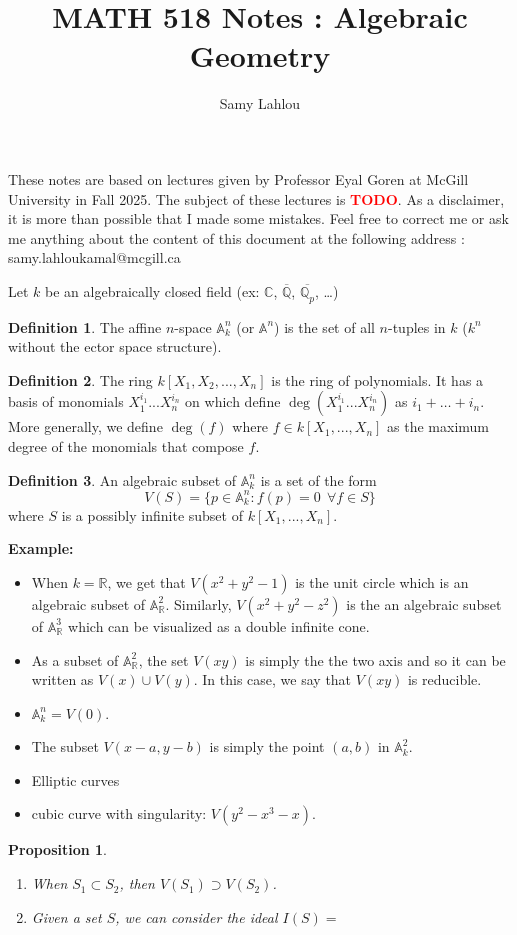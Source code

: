 \documentclass{article}
\title{MATH 518 Notes : Algebraic Geometry}
\author{Samy Lahlou}
\date{}
\theoremstyle{plain}
\newtheorem{proposition}[theorem]{Proposition}
\theoremstyle{definition}
\newtheorem*{definition}{Definition}
\newcommand{\A}{\mathbb{A}}
\newcommand{\C}{\mathbb{C}}
\newcommand{\R}{\mathbb{R}}
\newcommand{\Q}{\mathbb{Q}}
\newcommand{\td}{\textcolor{red}{\textbf{TODO}}}
\newenvironment{example}{\noindent\textbf{Example:} \vspace{-0.2cm}\begin{itemize}}{\end{itemize}}
\begin{document}
\maketitle

These notes are based on lectures given by Professor Eyal Goren at McGill University in Fall 2025. The subject of these lectures is \td. As a disclaimer, it is more than possible that I made some mistakes. Feel free to correct me or ask me anything about the content of this document at the following address : samy.lahloukamal@mcgill.ca

\tableofcontents

\newpage

Let $k$ be an algebraically closed field (ex: $\C$, $\overline{\Q}$, $\overline{\Q_p}$, \dots)

\begin{definition}
    The affine $n$-space $\A_k^n$ (or $\A^n$) is the set of all $n$-tuples in $k$ ($k^n$ without the ector space structure).
\end{definition}

\begin{definition}
    The ring $k[X_1, X_2, ..., X_n]$ is the ring of polynomials. It has a basis of monomials $X_1^{i_1}...X_n^{i_n}$ on which define $\deg(X_1^{i_1}...X_n^{i_n})$ as $i_1 + \dots + i_n$. More generally, we define $\deg(f)$ where $f \in k[X_1, ..., X_n]$ as the maximum degree of the monomials that compose $f$.
\end{definition}

\begin{definition}
    An algebraic subset of $\A_k^n$ is a set of the form
    $$V(S) = \{p \in \A_k^n : f(p) = 0 \ \ \forall f \in S\}$$
    where $S$ is a possibly infinite subset of $k[X_1, ..., X_n]$.
\end{definition}

\begin{example}
    \item When $k = \R$, we get that $V(x^2 + y^2 - 1)$ is the unit circle which is an algebraic subset of $\A_{\R}^2$. Similarly, $V(x^2 + y^2 - z^2)$ is the an algebraic subset of $\A_{\R}^3$ which can be visualized as a double infinite cone.
    \item As a subset of $\A_{\R}^2$, the set $V(xy)$ is simply the the two axis and so it can be written as $V(x)\cup V(y)$. In this case, we say that $V(xy)$ is reducible.
    \item $\A_k^n = V(0)$.
    \item The subset $V(x-a, y-b)$ is simply the point $(a,b)$ in $\A_k^2$.
    \item Elliptic curves 
    \item cubic curve with singularity: $V(y^2 - x^3 - x)$.
\end{example}


\begin{proposition}
    \begin{enumerate}
        \item When $S_1 \subset S_2$, then $V(S_1) \supset V(S_2)$.
        \item Given a set $S$, we can consider the ideal $I(S) = $
    \end{enumerate}
\end{proposition}
\end{document}
